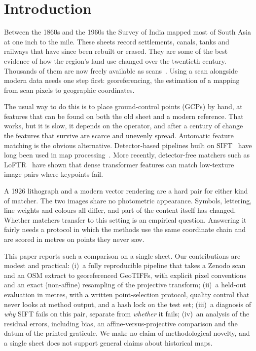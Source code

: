 \documentclass[10pt,twocolumn]{article}
\begin{document}
\section{Introduction}

Between the 1860s and the 1960s the Survey of India mapped most of South Asia at one inch to the mile. These sheets record settlements, canals, tanks and railways that have since been rebuilt or erased. They are some of the best evidence of how the region's land use changed over the twentieth century. Thousands of them are now freely available as scans~\citep{brown_soi_zenodo}. Using a scan alongside modern data needs one step first: georeferencing, the estimation of a mapping from scan pixels to geographic coordinates.

The usual way to do this is to place ground-control points (GCPs) by hand, at features that can be found on both the old sheet and a modern reference. That works, but it is slow, it depends on the operator, and after a century of change the features that survive are scarce and unevenly spread. Automatic feature matching is the obvious alternative. Detector-based pipelines built on SIFT~\citep{lowe2004sift} have long been used in map processing~\citep{chiang2014survey}. More recently, detector-free matchers such as LoFTR~\citep{sun2021loftr} have shown that dense transformer features can match low-texture image pairs where keypoints fail.

A 1926 lithograph and a modern vector rendering are a hard pair for either kind of matcher. The two images share no photometric appearance. Symbols, lettering, line weights and colours all differ, and part of the content itself has changed. Whether matchers transfer to this setting is an empirical question. Answering it fairly needs a protocol in which the methods use the same coordinate chain and are scored in metres on points they never saw.

This paper reports such a comparison on a single sheet. Our contributions are modest and practical:
(i)~a fully reproducible pipeline that takes a Zenodo scan and an OSM extract to georeferenced GeoTIFFs, with explicit pixel conventions and an exact (non-affine) resampling of the projective transform;
(ii)~a held-out evaluation in metres, with a written point-selection protocol, quality control that never looks at method output, and a hash lock on the test set;
(iii)~a diagnosis of \emph{why} SIFT fails on this pair, separate from \emph{whether} it fails;
(iv)~an analysis of the residual errors, including bias, an affine-versus-projective comparison and the datum of the printed graticule.
We make no claim of methodological novelty, and a single sheet does not support general claims about historical maps.
\end{document}
